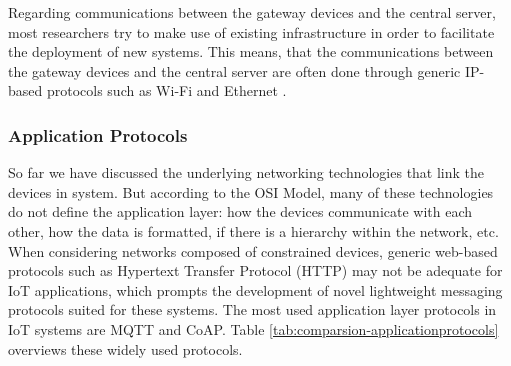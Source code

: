 Regarding communications between the gateway devices and the central server, most researchers try to make use of existing infrastructure in order to facilitate the deployment of new systems. This means, that the communications between the gateway devices and the central server are often done through generic IP-based protocols such as Wi-Fi and Ethernet \cite{Adame2018, Fuhrer2006, Wu2020, Catarinucci2015}. \bigskip

\subsubsection{Application Protocols}

So far we have discussed the underlying networking technologies that link the devices in system. But according to the OSI Model, many of these technologies do not define the application layer: how the devices communicate with each other, how the data is formatted, if there is a hierarchy within the network, etc. When considering networks composed of constrained devices, generic web-based protocols such as Hypertext Transfer Protocol (HTTP) may not be adequate for \acs{IoT} applications, which prompts the development of novel lightweight messaging protocols suited for these systems. The most used application layer protocols in \acs{IoT} systems are \acf{MQTT} and \acf{CoAP}. Table \ref{tab:comparsion-applicationprotocols} overviews these widely used protocols. \bigskip

